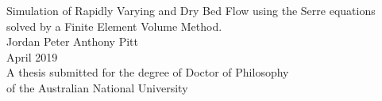 \begin{titlepage}
\begin{center}

\vspace*{\fill} \Huge
                        Simulation of Rapidly Varying and Dry Bed Flow 
                        using the Serre equations solved by a Finite Element Volume Method.
\\
\vfill\vfill\Large
                          Jordan Peter Anthony Pitt
\\
\vfill\vfill
                          April 2019
\\
\vfill\vfill \normalsize
         A thesis submitted for the degree of Doctor of Philosophy\\
         of the Australian National University
\vfill
         \anulogo

\end{center}

\end{titlepage}
